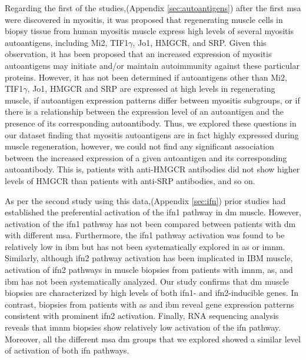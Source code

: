 Regarding the first of the studies,(Appendix \autoref{sec:autoantigens}) after the first \gls{msa} were discovered in myositis, it was proposed that regenerating muscle cells in biopsy tissue from human myositis muscle express high levels of several myositis autoantigens, including Mi2, TIF1$\gamma$, Jo1, HMGCR, and SRP.\cite{Mohassel2015,Mammen2009,CasciolaRosen2005,Allenbach2018} Given this observation, it has been proposed that an increased expression of myositis autoantigens may initiate and/or maintain autoimmunity against these particular proteins. However, it has not been determined if autoantigens other than Mi2, TIF1$\gamma$, Jo1, HMGCR and SRP are expressed at high levels in regenerating muscle, if autoantigen expression patterns differ between myositis subgroups, or if there is a relationship between the expression level of an autoantigen and the presence of its corresponding autoantibody. Thus, we explored these questions in our dataset finding that myositis autoantigens are in fact highly expressed during muscle regeneration, however, we could not find any significant association between the increased expression of a given autoantigen and its corresponding autoantibody. This is, patients with anti-HMGCR antibodies did not show higher levels of HMGCR than patients with anti-SRP antibodies, and so on.

As per the second study using this data,(Appendix \autoref{sec:ifn}) prior studies had established the preferential activation of the \gls{ifn}1 pathway in \gls{dm} muscle.\cite{Greenberg2005} However, activation of the \gls{ifn}1 pathway has not been compared between patients with \gls{dm} with different \gls{msa}. Furthermore, the \gls{ifn}1 pathway activation was found to be relatively low in \gls{ibm} but has not been systematically explored in \gls{as} or \gls{imnm}.\cite{Greenberg2005,Salajegheh2010,Greenberg2002} Similarly, although \gls{ifn}2 pathway activation has been implicated in IBM muscle,\cite{Ivanidze2011,Allenbach2014} activation of \gls{ifn}2 pathways in muscle biopsies from patients with \gls{imnm}, \gls{as}, and \gls{ibm} has not been systematically analyzed. Our study confirms that \gls{dm} muscle biopsies are characterized by high levels of both \gls{ifn}1- and \gls{ifn}2-inducible genes. In contrast, biopsies from patients with \gls{as} and \gls{ibm} reveal gene expression patterns consistent with prominent \gls{ifn}2 activation. Finally, RNA sequencing analysis reveals that \gls{imnm} biopsies show relatively low activation of the \gls{ifn} pathway. Moreover, all the different \gls{msa} \gls{dm} groups that we explored showed a similar level of activation of both \gls{ifn} pathways.

